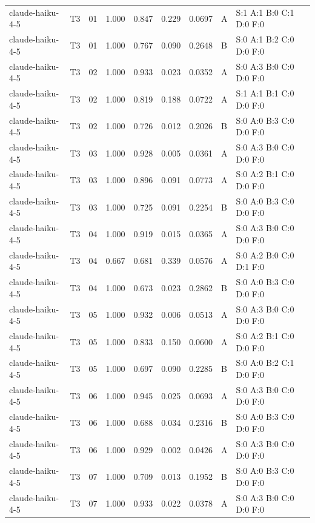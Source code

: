 \begin{longtable}{llrrrrrll}
claude-haiku-4-5 & T3 & 01 & 1.000 & 0.847 & 0.229 & 0.0697 & A & \tiny S:1 A:1 B:0 C:1 D:0 F:0 \\
claude-haiku-4-5 & T3 & 01 & 1.000 & 0.767 & 0.090 & 0.2648 & B & \tiny S:0 A:1 B:2 C:0 D:0 F:0 \\
claude-haiku-4-5 & T3 & 02 & 1.000 & 0.933 & 0.023 & 0.0352 & A & \tiny S:0 A:3 B:0 C:0 D:0 F:0 \\
claude-haiku-4-5 & T3 & 02 & 1.000 & 0.819 & 0.188 & 0.0722 & A & \tiny S:1 A:1 B:1 C:0 D:0 F:0 \\
claude-haiku-4-5 & T3 & 02 & 1.000 & 0.726 & 0.012 & 0.2026 & B & \tiny S:0 A:0 B:3 C:0 D:0 F:0 \\
claude-haiku-4-5 & T3 & 03 & 1.000 & 0.928 & 0.005 & 0.0361 & A & \tiny S:0 A:3 B:0 C:0 D:0 F:0 \\
claude-haiku-4-5 & T3 & 03 & 1.000 & 0.896 & 0.091 & 0.0773 & A & \tiny S:0 A:2 B:1 C:0 D:0 F:0 \\
claude-haiku-4-5 & T3 & 03 & 1.000 & 0.725 & 0.091 & 0.2254 & B & \tiny S:0 A:0 B:3 C:0 D:0 F:0 \\
claude-haiku-4-5 & T3 & 04 & 1.000 & 0.919 & 0.015 & 0.0365 & A & \tiny S:0 A:3 B:0 C:0 D:0 F:0 \\
claude-haiku-4-5 & T3 & 04 & 0.667 & 0.681 & 0.339 & 0.0576 & A & \tiny S:0 A:2 B:0 C:0 D:1 F:0 \\
claude-haiku-4-5 & T3 & 04 & 1.000 & 0.673 & 0.023 & 0.2862 & B & \tiny S:0 A:0 B:3 C:0 D:0 F:0 \\
claude-haiku-4-5 & T3 & 05 & 1.000 & 0.932 & 0.006 & 0.0513 & A & \tiny S:0 A:3 B:0 C:0 D:0 F:0 \\
claude-haiku-4-5 & T3 & 05 & 1.000 & 0.833 & 0.150 & 0.0600 & A & \tiny S:0 A:2 B:1 C:0 D:0 F:0 \\
claude-haiku-4-5 & T3 & 05 & 1.000 & 0.697 & 0.090 & 0.2285 & B & \tiny S:0 A:0 B:2 C:1 D:0 F:0 \\
claude-haiku-4-5 & T3 & 06 & 1.000 & 0.945 & 0.025 & 0.0693 & A & \tiny S:0 A:3 B:0 C:0 D:0 F:0 \\
claude-haiku-4-5 & T3 & 06 & 1.000 & 0.688 & 0.034 & 0.2316 & B & \tiny S:0 A:0 B:3 C:0 D:0 F:0 \\
claude-haiku-4-5 & T3 & 06 & 1.000 & 0.929 & 0.002 & 0.0426 & A & \tiny S:0 A:3 B:0 C:0 D:0 F:0 \\
claude-haiku-4-5 & T3 & 07 & 1.000 & 0.709 & 0.013 & 0.1952 & B & \tiny S:0 A:0 B:3 C:0 D:0 F:0 \\
claude-haiku-4-5 & T3 & 07 & 1.000 & 0.933 & 0.022 & 0.0378 & A & \tiny S:0 A:3 B:0 C:0 D:0 F:0 \\

\end{longtable}
